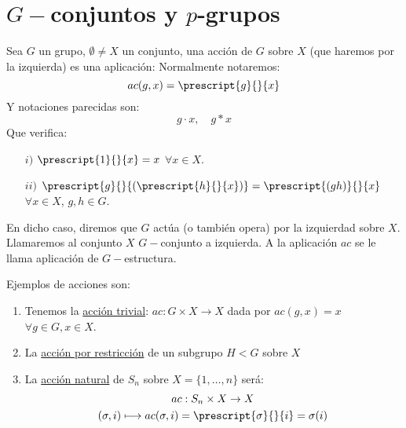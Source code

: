 \chapter{$G-$conjuntos y $p$-grupos}

\begin{definicion}
    Sea $G$ un grupo, $\emptyset \neq X$ un conjunto, una acción de $G$ sobre $X$ (que haremos por la izquierda) es una aplicación: 
    Normalmente notaremos:
    \begin{equation*}
        ac(g,x) = \prescript{g}{}{x}
    \end{equation*}
    Y notaciones parecidas son:
    \begin{equation*}
        g\cdot x, \quad g\ast x
    \end{equation*}
    Que verifica:
    \begin{enumerate}
        \item[$i)$] $\prescript{1}{}{x} = x$ $\forall x\in X$.
        \item[$ii)$] $\prescript{g}{}{(\prescript{h}{}{x})}= \prescript{(gh)}{}{x}$ $\forall x\in X$, $g,h\in G$.
    \end{enumerate}
    En dicho caso, diremos que $G$ actúa (o también opera) por la izquierdad sobre $X$. Llamaremos al conjunto $X$ $G-$conjunto a izquierda. A la aplicación $ac$ se le llama aplicación de $G-$estructura.
\end{definicion}

\begin{ejemplo}
    Ejemplos de acciones son:
    \begin{enumerate}
        \item Tenemos la \underline{acción trivial}: $ac:G\times X \to X$ dada por $ac(g,x) = x$ $\forall g\in G, x\in X$.
        \item La \underline{acción por restricción} de un subgrupo $H<G$ sobre $X$
            \begin{figure}[H]
                \centering
            \end{figure}
        \item La \underline{acción natural} de $S_n$ sobre $X = \{1,\ldots,n\}$ será:
            \begin{gather*}
                ac:S_n\times X \to X \\
                (\sigma,i) \longmapsto ac(\sigma,i) = \prescript{\sigma}{}{i} = \sigma(i)
            \end{gather*}
    \end{enumerate}
\end{ejemplo}

